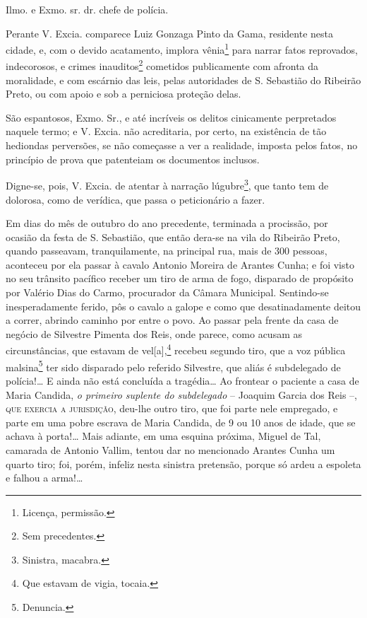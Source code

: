 Ilmo. e Exmo. sr. dr. chefe de polícia.

Perante V. Excia. comparece Luiz Gonzaga Pinto da Gama, residente nesta
cidade, e, com o devido acatamento, implora vênia\footnote{ Licença,
  permissão.} para narrar fatos reprovados, indecorosos, e crimes
inauditos\footnote{ Sem precedentes.} cometidos publicamente com
afronta da moralidade, e com escárnio das leis, pelas autoridades de S.
Sebastião do Ribeirão Preto, ou com apoio e sob a perniciosa proteção
delas.

São espantosos, Exmo. Sr., e até incríveis os delitos cinicamente
perpretados naquele termo; e V. Excia. não acreditaria, por certo, na
existência de tão hediondas perversões, se não começasse a ver a
realidade, imposta pelos fatos, no princípio de prova que patenteiam os
documentos inclusos.

Digne-se, pois, V. Excia. de atentar à narração lúgubre\footnote{
  Sinistra, macabra.}, que tanto tem de dolorosa, como de verídica, que
passa o peticionário a fazer.

Em dias do mês de outubro do ano precedente, terminada a procissão, por
ocasião da festa de S. Sebastião, que então dera-se na vila do Ribeirão
Preto, quando passeavam, tranquilamente, na principal rua, mais de 300
pessoas, aconteceu por ela passar à cavalo Antonio Moreira de Arantes
Cunha; e foi visto no seu trânsito pacífico receber um tiro de arma de
fogo, disparado de propósito por Valério Dias do Carmo, procurador da
Câmara Municipal. Sentindo-se inesperadamente ferido, pôs o cavalo a
galope e como que desatinadamente deitou a correr, abrindo caminho por
entre o povo. Ao passar pela frente da casa de negócio de Silvestre
Pimenta dos Reis, onde parece, como acusam as circunstâncias, que
estavam de vel{[}a{]},\footnote{ Que estavam de vigia, tocaia.} recebeu
segundo tiro, que a voz pública malsina\footnote{ Denuncia.} ter sido
disparado pelo referido Silvestre, que aliás é subdelegado de
polícia!\ldots{} E ainda não está concluída a tragédia\ldots{} Ao frontear o
paciente a casa de Maria Candida, \emph{o primeiro suplente do
subdelegado} -- Joaquim Garcia dos Reis --, \textsc{que exercia a jurisdição},
deu-lhe outro tiro, que foi parte nele empregado, e parte em uma pobre
escrava de Maria Candida, de 9 ou 10 anos de idade, que se achava à
porta!\ldots{} Mais adiante, em uma esquina próxima, Miguel de Tal, camarada
de Antonio Vallim, tentou dar no mencionado Arantes Cunha um quarto
tiro; foi, porém, infeliz nesta sinistra pretensão, porque só ardeu a
espoleta e falhou a arma!\ldots{}

